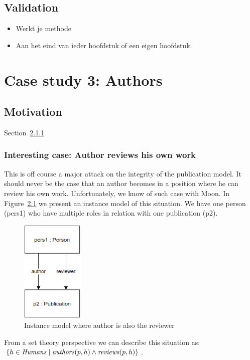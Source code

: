 \documentclass{ou-report}
\newcommand{\outline}[1]{{\color{blue} #1}}
\begin{document}
\section{Validation}
\outline{
\begin{itemize}
    \item Werkt je methode
    \item Aan het eind van ieder hoofdstuk of een eigen hoofdstuk
\end{itemize}
}
\chapter{Case study 3: Authors}
\label{chp:case3}
\section{Motivation}
Section~\ref{interesting_case:author_reviews_own_work}

\subsection{Interesting case: Author reviews his own work}
\label{interesting_case:author_reviews_own_work}
This is off course a major attack on the integrity of the publication model. It 
should never be the case that an author becomes in a position where he can 
review his own work. Unfortunately, we know of such case with Moon. In 
Figure~\ref{fig:air} we present an instance model of this situation. We have 
one person (pers1) who have multiple roles in relation with one publication (p2).

\begin{figure}[H]
\centering
\includegraphics[width=3cm]{images/author_is_reviewer.drawio.png}
\caption{Instance model where author is also the reviewer}
\label{fig:air}
\end{figure}
From a set theory perspective we can describe this situation as: 
$\{h \in \mathit{Humans} \mid \mathit{authors}(p, h) \land \mathit{reviews}(p, h)\}$.
\end{document}

